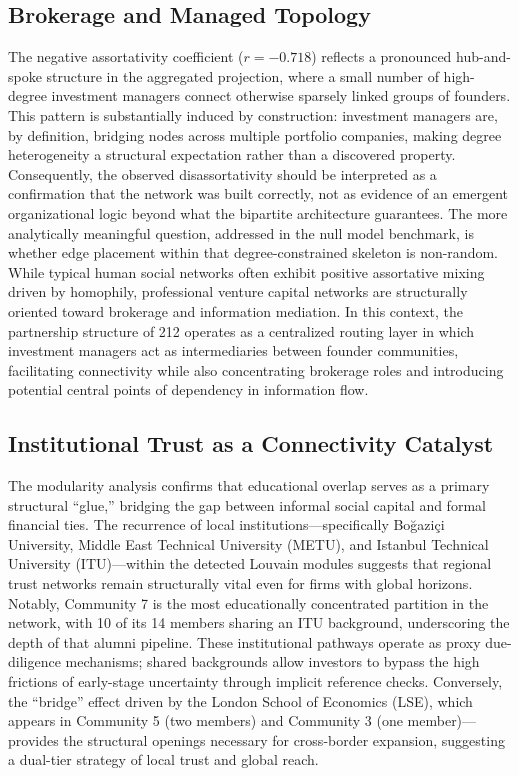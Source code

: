 \documentclass[conference]{IEEEtran}
\begin{document}
\subsection{Brokerage and Managed Topology}
The negative assortativity coefficient ($r = -0.718$) reflects a pronounced hub-and-spoke structure in the aggregated projection, where a small number of high-degree investment managers connect otherwise sparsely linked groups of founders. This pattern is substantially induced by construction: investment managers are, by definition, bridging nodes across multiple portfolio companies, making degree heterogeneity a structural expectation rather than a discovered property. Consequently, the observed disassortativity should be interpreted as a confirmation that the network was built correctly, not as evidence of an emergent organizational logic beyond what the bipartite architecture guarantees. The more analytically meaningful question, addressed in the null model benchmark, is whether edge placement within that degree-constrained skeleton is non-random. While typical human social networks often exhibit positive assortative mixing driven by homophily, professional venture capital networks are structurally oriented toward brokerage and information mediation. In this context, the partnership structure of 212 operates as a centralized routing layer in which investment managers act as intermediaries between founder communities, facilitating connectivity while also concentrating brokerage roles and introducing potential central points of dependency in information flow.

\subsection{Institutional Trust as a Connectivity Catalyst}
The modularity analysis confirms that educational overlap serves as a primary structural ``glue,'' bridging the gap between informal social capital and formal financial ties. The recurrence of local institutions—specifically Boğaziçi University, Middle East Technical University (METU), and Istanbul Technical University (ITU)—within the detected Louvain modules suggests that regional trust networks remain structurally vital even for firms with global horizons. Notably, Community 7 is the most educationally concentrated partition in the network, with 10 of its 14 members sharing an ITU background, underscoring the depth of that alumni pipeline. These institutional pathways operate as proxy due-diligence mechanisms; shared backgrounds allow investors to bypass the high frictions of early-stage uncertainty through implicit reference checks. Conversely, the ``bridge'' effect driven by the London School of Economics (LSE), which appears in Community 5 (two members) and Community 3 (one member)—provides the structural openings necessary for cross-border expansion, suggesting a dual-tier strategy of local trust and global reach.
\end{document}
